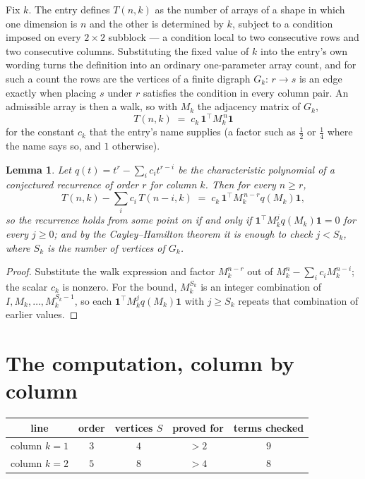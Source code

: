 \documentclass[11pt,a4paper]{article}
\theoremstyle{plain}
\newtheorem{lemma}[theorem]{Lemma}
\theoremstyle{definition}
\begin{document}
Fix $k$. The entry defines $T(n,k)$ as the number of arrays of a shape in which one dimension
is $n$ and the other is determined by $k$, subject to a condition imposed on every
$2\times2$ subblock --- a condition local to two consecutive rows and two consecutive columns.
Substituting the fixed value of $k$ into the entry's own wording turns the definition into an
ordinary one-parameter array count, and for such a count the rows are the vertices of a finite
digraph $G_k$: $r\to s$ is an edge exactly when placing $s$ under $r$ satisfies the condition
in every column pair. An admissible array is then a walk, so with $M_k$ the adjacency matrix
of $G_k$,
\[
T(n,k)\;=\;c_k\,\mathbf{1}^{\!\top}M_k^{\,n}\mathbf{1}
\]
for the constant $c_k$ that the entry's name supplies (a factor such as $\tfrac12$ or
$\tfrac14$ where the name says so, and $1$ otherwise).

\begin{lemma}\label{lem:crit}
Let $q(t)=t^{r}-\sum_i c_it^{r-i}$ be the characteristic polynomial of a conjectured
recurrence of order $r$ for column $k$. Then for every $n\ge r$,
\[
T(n,k)-\sum_i c_i\,T(n-i,k)\;=\;c_k\,\mathbf{1}^{\!\top}M_k^{\,n-r}q(M_k)\mathbf{1},
\]
so the recurrence holds from some point on if and only if
$\mathbf{1}^{\!\top}M_k^{j}q(M_k)\mathbf{1}=0$ for every $j\ge0$; and by the
Cayley--Hamilton theorem it is enough to check $j<S_k$, where $S_k$ is the number of vertices
of $G_k$.
\end{lemma}

\begin{proof}
Substitute the walk expression and factor $M_k^{n-r}$ out of $M_k^{n}-\sum_ic_iM_k^{n-i}$;
the scalar $c_k$ is nonzero. For the bound, $M_k^{S_k}$ is an integer combination of
$I,M_k,\dots,M_k^{S_k-1}$, so each $\mathbf{1}^{\!\top}M_k^{j}q(M_k)\mathbf{1}$ with
$j\ge S_k$ repeats that combination of earlier values.
\end{proof}

\section{The computation, column by column}

\begin{center}
\begin{tabular}{ccccc}
line & order & vertices $S$ & proved for & terms checked \\ \hline
column $k$$=1$ & $3$ & $4$ & $>2$ & $9$ \\
column $k$$=2$ & $5$ & $8$ & $>4$ & $8$ \\
\end{tabular}
\end{center}
\end{document}
